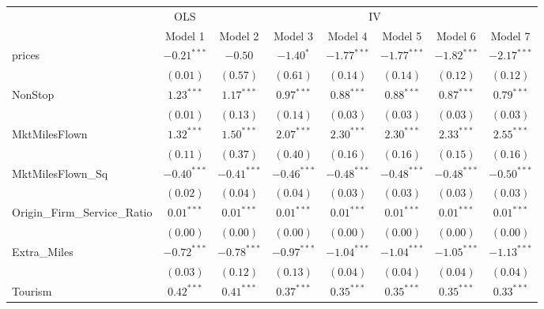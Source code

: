 
\begin{tabular}{l c c c c c c c}
\toprule
 & \multicolumn{1}{c}{OLS} & \multicolumn{6}{c}{IV} \\
\cmidrule(lr){2-2} \cmidrule(lr){3-8}
 & Model 1 & Model 2 & Model 3 & Model 4 & Model 5 & Model 6 & Model 7 \\
\midrule
prices                       & $-0.21^{***}$ & $-0.50$       & $-1.40^{*}$   & $-1.77^{***}$ & $-1.77^{***}$    & $-1.82^{***}$ & $-2.17^{***}$  \\
                             & $(0.01)$      & $(0.57)$      & $(0.61)$      & $(0.14)$      & $(0.14)$         & $(0.12)$      & $(0.12)$       \\
NonStop                      & $1.23^{***}$  & $1.17^{***}$  & $0.97^{***}$  & $0.88^{***}$  & $0.88^{***}$     & $0.87^{***}$  & $0.79^{***}$   \\
                             & $(0.01)$      & $(0.13)$      & $(0.14)$      & $(0.03)$      & $(0.03)$         & $(0.03)$      & $(0.03)$       \\
MktMilesFlown                & $1.32^{***}$  & $1.50^{***}$  & $2.07^{***}$  & $2.30^{***}$  & $2.30^{***}$     & $2.33^{***}$  & $2.55^{***}$   \\
                             & $(0.11)$      & $(0.37)$      & $(0.40)$      & $(0.16)$      & $(0.16)$         & $(0.15)$      & $(0.16)$       \\
MktMilesFlown\_Sq            & $-0.40^{***}$ & $-0.41^{***}$ & $-0.46^{***}$ & $-0.48^{***}$ & $-0.48^{***}$    & $-0.48^{***}$ & $-0.50^{***}$  \\
                             & $(0.02)$      & $(0.04)$      & $(0.04)$      & $(0.03)$      & $(0.03)$         & $(0.03)$      & $(0.03)$       \\
Origin\_Firm\_Service\_Ratio & $0.01^{***}$  & $0.01^{***}$  & $0.01^{***}$  & $0.01^{***}$  & $0.01^{***}$     & $0.01^{***}$  & $0.01^{***}$   \\
                             & $(0.00)$      & $(0.00)$      & $(0.00)$      & $(0.00)$      & $(0.00)$         & $(0.00)$      & $(0.00)$       \\
Extra\_Miles                 & $-0.72^{***}$ & $-0.78^{***}$ & $-0.97^{***}$ & $-1.04^{***}$ & $-1.04^{***}$    & $-1.05^{***}$ & $-1.13^{***}$  \\
                             & $(0.03)$      & $(0.12)$      & $(0.13)$      & $(0.04)$      & $(0.04)$         & $(0.04)$      & $(0.04)$       \\
Tourism                      & $0.42^{***}$  & $0.41^{***}$  & $0.37^{***}$  & $0.35^{***}$  & $0.35^{***}$     & $0.35^{***}$  & $0.33^{***}$   \\

\end{tabular}
